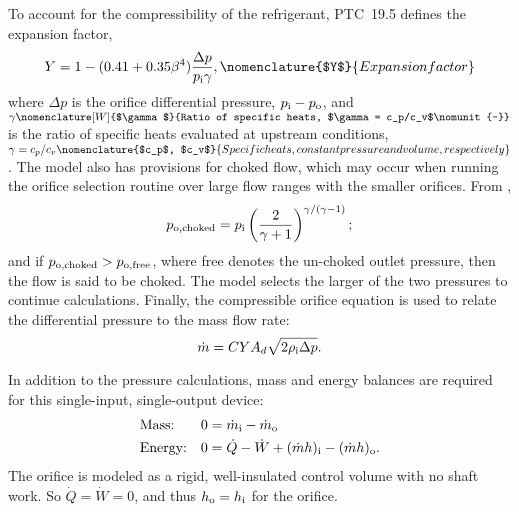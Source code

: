 To account for the compressibility of the refrigerant, PTC~19.5 defines
the expansion factor,
\begin{equation}
Y = 1 - (0.41 + 0.35 \beta^4) \frac{\Delta p}{p_{\inl}\gamma},
\nomenclature{$Y$}{Expansion factor\nomunit{-}}
\end{equation}
where $\Delta p$ is the orifice differential pressure, $p_{\text{i}}-p_{\text{o}}$, and
$\gamma\nomenclature[W]{$\gamma$}{Ratio of specific heats, $\gamma = c_p/c_v$\nomunit{-}}$ 
is the ratio of specific heats evaluated at upstream conditions, 
$\gamma = c_p/c_v\nomenclature{$c_p$, $c_v$}{Specific heats, constant pressure and volume, respectively\nomunit{\btu\per\poundmass\rankine}}$.
%
%
%
%
%
The model also has provisions for choked flow, which may occur when 
running the orifice selection routine over large flow ranges with the smaller orifices.
From \textcite{munson2009}, 
\begin{equation}
p_{\text{o},\text{choked}} = p_{\text{i}} \left(\frac{2}{\gamma+1}\right)^{\gamma/(\gamma-1)};
\label{eqn:choked}
\end{equation}
and if $p_{\text{o},\text{choked}} > p_{\text{o},\text{free}}$, where free denotes 
the un-choked outlet pressure, then the flow is said to be choked.
The model selects the larger of the two pressures to continue calculations.
Finally, the compressible orifice equation is used to relate the differential pressure to the mass flow rate:
\begin{equation}
\dot{m} = C Y A_d \sqrt{2\rho_{\text{i}} \Delta p}.
\end{equation}

In addition to the pressure calculations, mass and energy balances are required
for this single-input, single-output device:
\begin{align}
  &\text{Mass:}   & 0 &= {\dot{m}_{\inl}} - {\dot{m}_{\out}} \\ %
  &\text{Energy:} & 0 &= \dot{Q} - \dot{W} + {(\dot{m}h)_{\inl}} - 
		{(\dot{m}h)_{\out}} \label{eqn:OrifEnergy}.
\end{align}
The orifice is modeled as a rigid, well-insulated control volume with no shaft work. 
So $\dot{Q}=\dot{W}=0$, and thus $h_{\text{o}} = h_{\text{i}}$ for the orifice.

